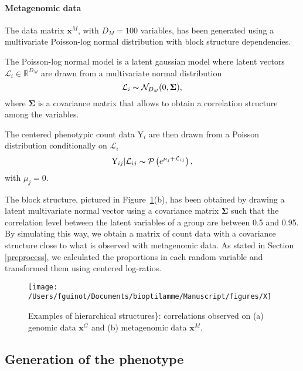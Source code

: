 \documentclass[]{book}
\let\oldparagraph\paragraph
\renewcommand{\paragraph}[1]{\oldparagraph{#1}\mbox{}}
\begin{document}
\hypertarget{metagenomic-data}{%
\paragraph{Metagenomic data}\label{metagenomic-data}}

The data matrix \(\mathbf{x}^{\mathit{M}}\), with \(D_\mathit{M}=100\) variables, has been
generated using a multivariate Poisson-log normal distribution
\citep{aitchison1989multivariate} with block structure dependencies.

The Poisson-log normal model is a latent gaussian model where latent
vectors \(\mathcal{L}_i \in \mathbb{R}^{D_\mathit{M}}\) are drawn from a multivariate
normal distribution
\[\mathcal{L}_i \thicksim \mathcal{N}_{D_\mathit{M}}(0, \boldsymbol{\Sigma}),\] where
\(\boldsymbol{\Sigma}\) is a covariance matrix that allows to obtain a correlation
structure among the variables.

The centered phenotypic count data \(\mathrm{Y}_i\) are then drawn from a Poisson
distribution conditionally on \(\mathcal{L}_i\)
\[\mathrm{Y}_{ij}|\mathcal{L}_{ij} \thicksim \mathcal{P}\left( e^{\mu_j + \mathcal{L}_{ij}}\right),\]
with \(\mu_j = 0\).

The block structure, pictured in Figure~\ref{fig:X}(b), has been obtained by
drawing a latent multivariate normal vector using a covariance matrix
\(\boldsymbol{\Sigma}\) such that the correlation level between the latent variables
of a group are between 0.5 and 0.95. By simulating this way, we obtain a
matrix of count data with a covariance structure close to what is
observed with metagenomic data. As stated in Section \ref{preprocess},
we calculated the proportions in each random variable and transformed
them using centered log-ratios.



\begin{figure}

{\centering \texttt{[image: /Users/fguinot/Documents/bioptilamme/Manuscript/figures/X]} 

}

\caption{Examples of hierarchical structures\}: correlations observed on (a) genomic data \(\mathbf{x}^\mathit{G}\) and (b) metagenomic data \(\mathbf{x}^\mathit{M}\).}\label{fig:X}
\end{figure}

\hypertarget{generation-of-the-phenotype}{%
\subsection{Generation of the phenotype}\label{generation-of-the-phenotype}}
\end{document}
